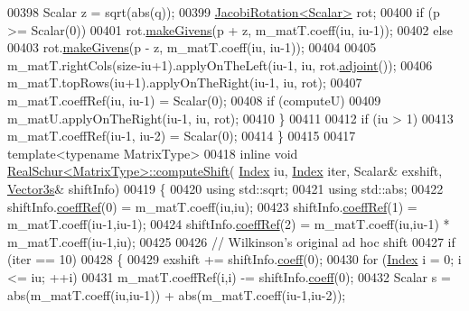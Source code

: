\begin{DoxyCode}
00398     Scalar z = sqrt(abs(q));
00399     \hyperlink{group___jacobi___module_class_eigen_1_1_jacobi_rotation}{JacobiRotation<Scalar>} rot;
00400     \textcolor{keywordflow}{if} (p >= Scalar(0))
00401       rot.\hyperlink{group___jacobi___module_af73c81e9cc139b7e0d877ce553b02ec0}{makeGivens}(p + z, m\_matT.coeff(iu, iu-1));
00402     \textcolor{keywordflow}{else}
00403       rot.\hyperlink{group___jacobi___module_af73c81e9cc139b7e0d877ce553b02ec0}{makeGivens}(p - z, m\_matT.coeff(iu, iu-1));
00404 
00405     m\_matT.rightCols(size-iu+1).applyOnTheLeft(iu-1, iu, rot.\hyperlink{group___jacobi___module_a89c8ea615f8fa77ddd5810a1e5fde4da}{adjoint}());
00406     m\_matT.topRows(iu+1).applyOnTheRight(iu-1, iu, rot);
00407     m\_matT.coeffRef(iu, iu-1) = Scalar(0); 
00408     \textcolor{keywordflow}{if} (computeU)
00409       m\_matU.applyOnTheRight(iu-1, iu, rot);
00410   \}
00411 
00412   \textcolor{keywordflow}{if} (iu > 1) 
00413     m\_matT.coeffRef(iu-1, iu-2) = Scalar(0);
00414 \}
00415 
00417 \textcolor{keyword}{template}<\textcolor{keyword}{typename} MatrixType>
00418 \textcolor{keyword}{inline} \textcolor{keywordtype}{void} \hyperlink{group___eigenvalues___module_class_eigen_1_1_real_schur}{RealSchur<MatrixType>::computeShift}(
      \hyperlink{group___eigenvalues___module_a8bd4653e2d9569a44ecc95e746422d3f}{Index} iu, \hyperlink{group___eigenvalues___module_a8bd4653e2d9569a44ecc95e746422d3f}{Index} iter, Scalar& exshift, \hyperlink{group___core___module}{Vector3s}& shiftInfo)
00419 \{
00420   \textcolor{keyword}{using} std::sqrt;
00421   \textcolor{keyword}{using} std::abs;
00422   shiftInfo.\hyperlink{class_eigen_1_1_plain_object_base_a25626a55b26a4323565f79d1b7c48ea8}{coeffRef}(0) = m\_matT.coeff(iu,iu);
00423   shiftInfo.\hyperlink{class_eigen_1_1_plain_object_base_a25626a55b26a4323565f79d1b7c48ea8}{coeffRef}(1) = m\_matT.coeff(iu-1,iu-1);
00424   shiftInfo.\hyperlink{class_eigen_1_1_plain_object_base_a25626a55b26a4323565f79d1b7c48ea8}{coeffRef}(2) = m\_matT.coeff(iu,iu-1) * m\_matT.coeff(iu-1,iu);
00425 
00426   \textcolor{comment}{// Wilkinson's original ad hoc shift}
00427   \textcolor{keywordflow}{if} (iter == 10)
00428   \{
00429     exshift += shiftInfo.\hyperlink{class_eigen_1_1_plain_object_base_afbfc12954f16d21aedb7bd839f64a278}{coeff}(0);
00430     \textcolor{keywordflow}{for} (\hyperlink{group___eigenvalues___module_a8bd4653e2d9569a44ecc95e746422d3f}{Index} i = 0; i <= iu; ++i)
00431       m\_matT.coeffRef(i,i) -= shiftInfo.\hyperlink{class_eigen_1_1_plain_object_base_afbfc12954f16d21aedb7bd839f64a278}{coeff}(0);
00432     Scalar s = abs(m\_matT.coeff(iu,iu-1)) + abs(m\_matT.coeff(iu-1,iu-2));

\end{DoxyCode}
